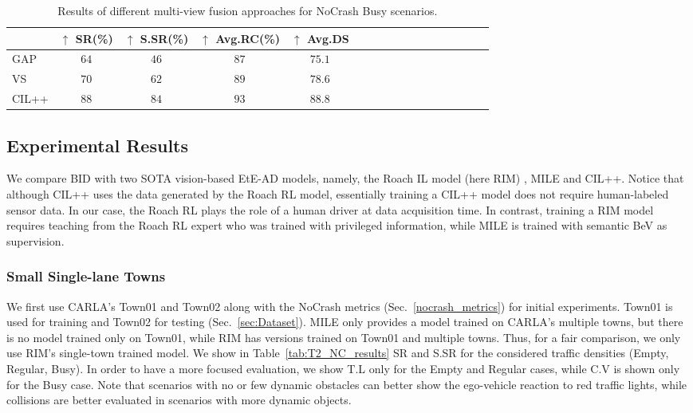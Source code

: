 \begin{table}
	\centering
	\begin{tabular}{@{}lcccccccccccccccc@{}}
		\toprule
		& $\uparrow$ SR(\%) & $\uparrow$ S.SR(\%) & $\uparrow$ Avg.RC(\%) & $\uparrow$ Avg.DS  \\
		\midrule
		GAP & $64$ & $46$ & $87$ & $75.1$  \\
		VS & $70$ & $62$ & $89$ & $78.6$  \\
		CIL++ & $88$ & $84$ & $93$ & $88.8$  \\ 
		\bottomrule
	\end{tabular}
	\caption{Results of different multi-view fusion approaches for NoCrash Busy scenarios.}
	\label{tab:ablation_study_sa}
\end{table}


\subsection{Experimental Results}
\label{sec:Results}
We compare BID with two SOTA vision-based EtE-AD models, namely, the Roach IL model (here RIM) \cite{Zhang:2021}, MILE \cite{Hu:2022} and CIL++. 
Notice that although CIL++ uses the data generated by the Roach RL model, essentially training a CIL++ model does not require human-labeled sensor data. 
In our case, the Roach RL plays the role of a human driver at data acquisition time. 
In contrast, training a RIM model requires teaching from the Roach RL expert who was trained with privileged information, while MILE is trained with semantic BeV as supervision.


\subsubsection{Small Single-lane Towns} \label{sec:small_town_results}
We first use CARLA's Town01 and Town02 along with the NoCrash metrics (Sec.~\ref{nocrash_metrics}) for initial experiments. 
Town01 is used for training and Town02 for testing (Sec.~\ref{sec:Dataset}). 
MILE only provides a model trained on CARLA's multiple towns, but there is no model trained only on Town01, while RIM has versions trained on Town01 and multiple towns. 
Thus, for a fair comparison, we only use RIM's single-town trained model. 
We show in Table~\ref{tab:T2_NC_results} SR and S.SR for the considered traffic densities (Empty, Regular, Busy). 
In order to have a more focused evaluation, we show T.L only for the Empty and Regular cases, while C.V is shown only for the Busy case. 
Note that scenarios with no or few dynamic obstacles can better show the ego-vehicle reaction to red traffic lights, while collisions are better evaluated in scenarios with more dynamic objects. 


